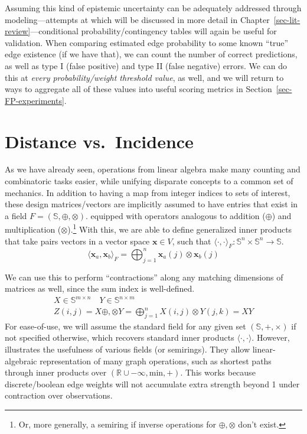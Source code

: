 \documentclass[%
	12pt,
		oneside,
		letterpaper
]{book}
\begin{document}
Assuming this kind of epistemic uncertainty can be adequately addressed
through modeling---attempts at which will be discussed in more detail in
Chapter~\ref{sec-lit-review}---conditional probability/contingency
tables will again be useful for validation. When comparing estimated
edge probability to some known ``true'' edge existence (if we have
that), we can count the number of correct predictions, as well as type I
(false positive) and type II (false negative) errors. We can do this at
\emph{every probability/weight threshold value}, as well, and we will
return to ways to aggregate all of these values into useful scoring
metrics in Section~\ref{sec-FP-experiments}.

\section{Distance vs.~Incidence}\label{sec-products}

As we have already seen, operations from linear algebra make many
counting and combinatoric tasks easier, while unifying disparate
concepts to a common set of mechanics. In addition to having a map from
integer indices to sets of interest, these design matrices/vectors are
implicitly assumed to have entries that exist in a field
\(F=(\mathbb{S},\oplus,\otimes)\). equipped with operators analogous to
addition (\(\oplus\)) and multiplication (\(\otimes\)).\footnote{ Or,
  more generally, a semiring if inverse operations for
  \(\oplus,\otimes\) don't exist.} With this, we are able to define
generalized inner products that take pairs vectors in a vector space
\(\mathbf{x}\in V\), such that
\(\langle\cdot,\cdot\rangle_F:\mathbb{S}^n\times \mathbb{S}^n\rightarrow \mathbb{S}\).
\[
\langle\mathbf{x}_a,\mathbf{x}_b\rangle_{F} = \bigoplus_{j=1}^n \mathbf{x}_a(j)\otimes\mathbf{x}_b(j)
\]

We can use this to perform ``contractions'' along any matching
dimensions of matrices as well, since the sum index is well-defined. \[
\begin{aligned}
X\in\mathbb{S}^{m\times n}\quad Y\in\mathbb{S}^{n\times m} \\
Z(i,j)=X\oplus,\otimes Y = \bigoplus_{j=1}^{n} X(i,j) \otimes Y(j,k) = XY
\end{aligned}
\] For ease-of-use, we will assume the standard field for any given set
\((\mathbb{S},+,\times)\) if not specified otherwise, which recovers
standard inner products \(\langle\cdot,\cdot\rangle\). However,
\textcite{MathematicalfoundationsGraphBLAS_Kepner2016} illustrates the
usefulness of various fields (or semirings). They allow linear-algebraic
representation of many graph operations, such as shortest paths through
inner products over \((\mathbb{R}\cup -\infty,\textrm{min}, +)\). This
works because discrete/boolean edge weights will not accumulate extra
strength beyond 1 under contraction over observations.
\end{document}
